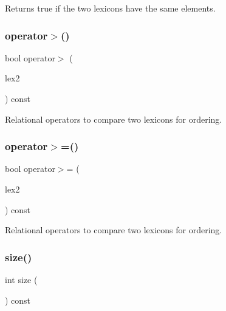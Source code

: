 Returns true if the two lexicons have the same elements. 

\mbox{\label{classDawgLexicon_ad36b61790c0aa454fddf60d15b52b158}} 
\subsubsection{\texorpdfstring{operator$>$()}{operator>()}}
{\footnotesize\ttfamily bool operator$>$ (\begin{DoxyParamCaption}\item[{const \mbox{\hyperlink{classDawgLexicon}{Dawg\+Lexicon}} \&}]{lex2 }\end{DoxyParamCaption}) const}



Relational operators to compare two lexicons for ordering. 

\mbox{\label{classDawgLexicon_af4f0508490235ae1af1b9234ac9fe01d}} 
\subsubsection{\texorpdfstring{operator$>$=()}{operator>=()}}
{\footnotesize\ttfamily bool operator$>$= (\begin{DoxyParamCaption}\item[{const \mbox{\hyperlink{classDawgLexicon}{Dawg\+Lexicon}} \&}]{lex2 }\end{DoxyParamCaption}) const}



Relational operators to compare two lexicons for ordering. 

\mbox{\label{classDawgLexicon_af9593d4a5ff4274efaf429cb4f9e57cc}} 
\subsubsection{\texorpdfstring{size()}{size()}}
{\footnotesize\ttfamily int size (\begin{DoxyParamCaption}{ }\end{DoxyParamCaption}) const}




